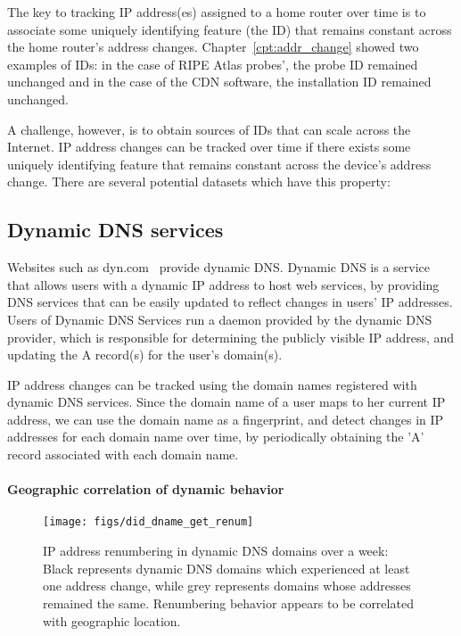 The key to tracking IP address(es) assigned to a home router over time
is to associate some uniquely identifying feature (the ID) that remains
constant across the home router's address
changes. Chapter~\ref{cpt:addr_change} showed two examples of IDs: in the
case of RIPE Atlas probes', the probe ID remained unchanged and in the
case of the CDN software, the installation ID remained unchanged.%

A challenge, however, is to obtain sources of IDs that can scale
across the Internet. IP address changes can
be tracked over time if there exists some uniquely identifying feature
that remains constant across the device's address change. There are several potential datasets which have this
property:

\subsection{Dynamic DNS services}

Websites such as dyn.com~\cite{dyn} provide dynamic DNS. Dynamic
DNS is a service that allows users with a dynamic IP address to host
web services, by providing DNS services that can be easily updated to
reflect changes in users' IP addresses. Users of Dynamic DNS Services
run a daemon provided by the dynamic DNS provider, which is responsible for
determining the publicly visible IP address, and updating the A
record(s) for the user's domain(s). 

IP address changes can be tracked using the domain names
registered with dynamic DNS services. Since the domain name of a user
maps to her current IP address, we can use the domain name as a
fingerprint, and detect changes in IP addresses for each domain name
over time, by periodically obtaining the 'A' record associated with
each domain name. 

\paragraph{Geographic correlation of dynamic behavior}

\begin{figure}[tb]
\begin{center}
\texttt{[image: figs/did\_dname\_get\_renum]}
\end{center}
\caption[IP address renumbering in dynamic DNS domains over a week]{\label{fig:addr_change_per_ctry}
IP address renumbering in dynamic DNS domains over a week: Black
represents dynamic DNS domains which experienced at least one address
change, while grey represents domains whose addresses remained the
same. Renumbering behavior appears to be correlated with geographic
location.}
\end{figure}

